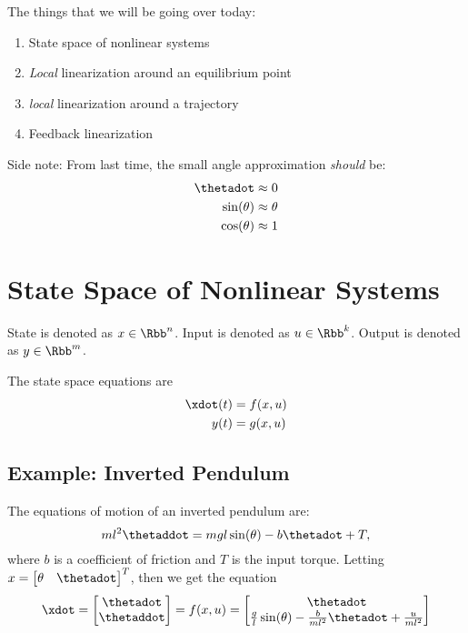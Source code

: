 \documentclass[10pt]{article}
\title{}
\author{}
\date{Sept. 2, 2014}
\begin{document}
\maketitle

The things that we will be going over today:
\begin{enumerate}
\item State space of nonlinear systems
\item \emph{Local} linearization around an equilibrium point
\item \emph{local} linearization around a trajectory
\item Feedback linearization
\end{enumerate}

Side note: From last time, the small angle approximation \emph{should}
be:
\begin{equation}
  \begin{split}
    \thetadot &\approx 0\\
    \sin(\theta) & \approx \theta\\
    \cos(\theta) & \approx 1
  \end{split}
\end{equation}

\section{State Space of Nonlinear Systems}

State is denoted as $x \in \Rbb^n$.
Input is denoted as $u \in \Rbb^k$.
Output is denoted as $y \in \Rbb^m$.

The state space equations are 
\begin{align}
  \xdot(t) &= f(x,u)\\
  y(t)     &= g(x,u)
\end{align}

\subsection{Example: Inverted Pendulum}

The equations of motion of an inverted pendulum are:
\begin{equation}
  ml^2\thetaddot = mgl\sin(\theta) - b\thetadot + T,
\end{equation}
where $b$ is a coefficient of friction and $T$ is the input torque.
Letting $x =
\begin{bmatrix}
  \theta & \thetadot
\end{bmatrix}^T$, then we get the equation
\begin{equation}
  \xdot =
  \begin{bmatrix}
    \thetadot\\ \thetaddot
  \end{bmatrix} = f(x,u) = 
  \begin{bmatrix}
    \thetadot\\ \frac{g}{l}\sin(\theta) - \frac{b}{ml^2}\thetadot +
    \frac{u}{ml^2} 
  \end{bmatrix}
\end{equation}
\end{document}
